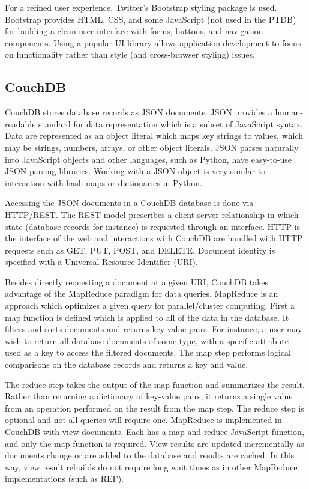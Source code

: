 \documentclass[journal]{IEEEtran}
\begin{document}
For a refined user experience, Twitter's Bootstrap styling package is used. Bootstrap 
provides HTML, CSS, and some JavaScript (not used in the PTDB) for building a clean
user interface with forms, buttons, and navigation components. Using a popular UI 
library allows application development to focus on functionality rather than style (and
cross-browser styling) issues.

\subsection{CouchDB}
CouchDB stores database records as JSON documents. JSON provides a human-readable
standard for data representation which is a subset of JavaScript syntax. Data are represented as an object
literal which maps key strings to values, which may be strings, numbers, arrays, or other object literals. 
JSON parses naturally into JavaScript objects and other languages, such as Python, have easy-to-use
JSON parsing libraries. Working with a JSON object is very similar to interaction with hash-maps or 
dictionaries in Python.

Accessing the JSON documents in a CouchDB database is done via HTTP/REST. The REST model prescribes a client-server
relationship in which state (database records for instance) is requested through an interface.
HTTP is the interface of the web and interactions with CouchDB are handled with HTTP
requests such as GET, PUT, POST, and DELETE. Document identity is specified with a Universal Resource Identifier (URI).

Besides directly requesting a document at a given URI, CouchDB takes advantage of the MapReduce paradigm for data
queries. MapReduce is an approach which optimizes a given query for parallel/cluster computing. First a map function
is defined which is applied to all of the data in the database. It filters and sorts documents and returns key-value
pairs. For instance, a user may wish to return all database documents of some type, with a specific attribute used as
a key to access the filtered documents. The map step performs logical comparisons on the database records and
returns a key and value.

The reduce step takes the output of the map function and summarizes the result. Rather than returning a dictionary
of key-value pairs, it returns a single value from an operation performed on the result from the map step. The reduce
step is optional and not all queries will require one. MapReduce is implemented in CouchDB with view documents. Each has
a map and reduce JavaScript function, and only the map function is required. View results are updated incrementally as
documents change or are added to the database and results are cached. In this way, view result rebuilds do not require
long wait times as in other MapReduce implementations (such as REF).
\end{document}
